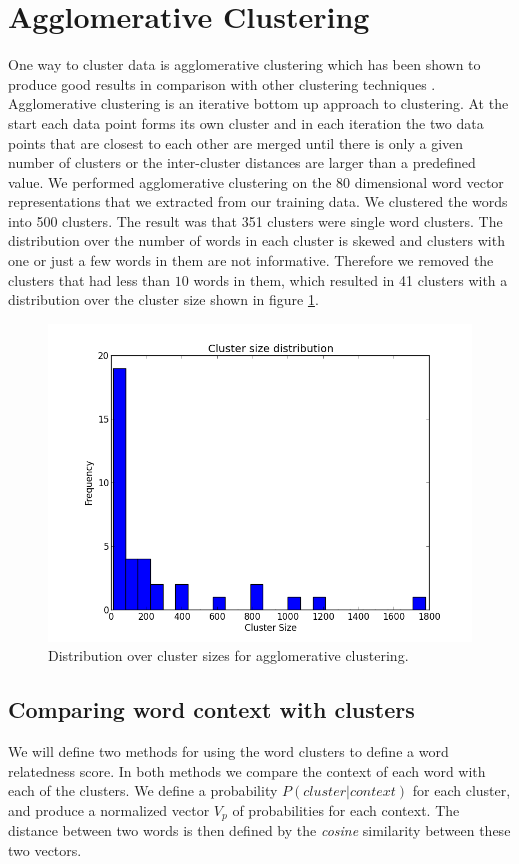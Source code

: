 \documentclass[11pt]{article}
\begin{document}
\section{Agglomerative Clustering}
One way to cluster data is agglomerative clustering which has been shown to produce good results in comparison with other clustering techniques \cite{clustering}. Agglomerative clustering is an iterative bottom up approach to clustering. At the start each data point forms its own cluster and in each iteration the two data points that are closest to each other are merged until there is only a given number of clusters or the inter-cluster distances are larger than a predefined value. We performed agglomerative clustering on the $80$ dimensional word vector representations that we extracted from our training data. We clustered the words into 500 clusters. The result was that 351 clusters were single word clusters. The distribution over the number of words in each cluster is skewed and clusters with one or just a few words in them are not informative. Therefore we removed the clusters that had less than $10$ words in them, which resulted in 41 clusters with a distribution over the cluster size shown in figure \ref{cluster_size}.
\begin{figure}
\center
\includegraphics[scale=0.40]{images/cluster_size.png}
\caption{Distribution over cluster sizes for agglomerative clustering.}
\label{cluster_size}
\end{figure}

\subsection{Comparing word context with clusters}
We will define two methods for using the word clusters to define a word relatedness score. In both methods we compare the context of each word with each of the clusters. We define a probability $P( cluster | context )$ for each cluster, and produce a normalized vector $V_p$ of probabilities for each context. The distance between two words is then defined by the \textit{cosine} similarity between these two vectors.
\end{document}

